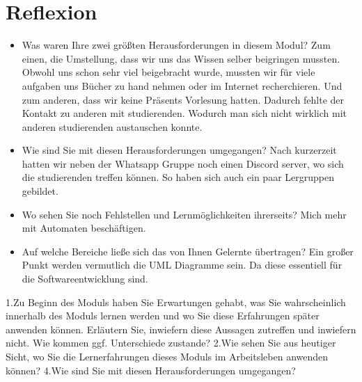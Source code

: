 \section{Reflexion}

\begin{itemize}
	\item Was waren Ihre zwei größten Herausforderungen in diesem Modul?
	\subitem Zum einen, die Umstellung, dass wir uns das Wissen selber beigringen mussten.
	Obwohl uns schon sehr viel beigebracht wurde, mussten wir für viele aufgaben uns Bücher zu
	hand nehmen oder im Internet recherchieren.
	\subitem Und zum anderen, dass wir keine Präsents Vorlesung hatten. Dadurch fehlte der
	Kontakt zu anderen mit studierenden. Wodurch man sich nicht wirklich mit anderen
	studierenden austauschen konnte.
	
	\item Wie sind Sie mit diesen Herausforderungen umgegangen?
	\subitem Nach kurzerzeit hatten wir neben der Whatsapp Gruppe noch einen Discord server,
	wo sich die studierenden treffen können. So haben sich auch ein paar Lergruppen gebildet.
	
	\item Wo sehen Sie noch Fehlstellen und Lernmöglichkeiten ihrerseits?
	\subitem Mich mehr mit Automaten beschäftigen.
	
	\item Auf welche Bereiche ließe sich das von Ihnen Gelernte übertragen?
	\subitem Ein großer Punkt werden vermutlich die UML Diagramme sein. Da diese essentiell für die Softwareentwicklung sind. 
\end{itemize}

1.Zu Beginn des Moduls haben Sie Erwartungen gehabt, was Sie wahrscheinlich innerhalb des Moduls lernen werden und wo Sie diese Erfahrungen später anwenden können. Erläutern Sie, inwiefern diese Aussagen zutreffen und inwiefern nicht. Wie kommen ggf. Unterschiede zustande?
2.Wie sehen Sie aus heutiger Sicht, wo Sie die Lernerfahrungen dieses Moduls im Arbeitsleben anwenden können?
4.Wie sind Sie mit diesen Herausforderungen umgegangen?

